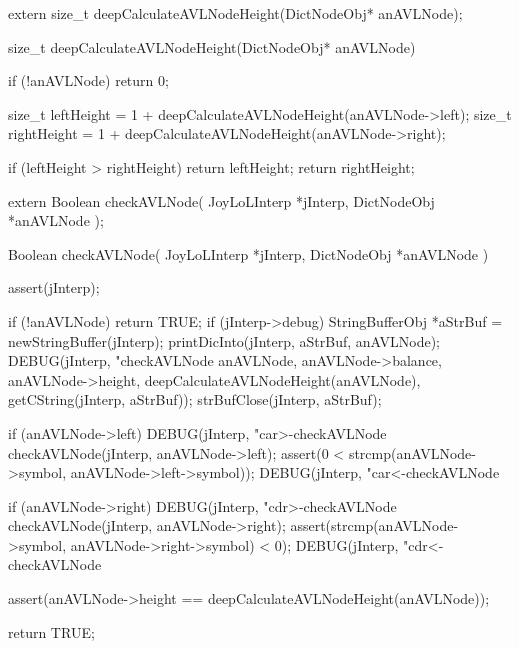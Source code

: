 \startCHeader
extern size_t deepCalculateAVLNodeHeight(DictNodeObj* anAVLNode);
\stopCHeader

\startCCode
size_t deepCalculateAVLNodeHeight(DictNodeObj* anAVLNode) {
  if (!anAVLNode) return 0;

  size_t leftHeight = 1 + deepCalculateAVLNodeHeight(anAVLNode->left);
  size_t rightHeight = 1 + deepCalculateAVLNodeHeight(anAVLNode->right);

  if (leftHeight > rightHeight) return leftHeight;
  return rightHeight;
}
\stopCCode

\startCHeader
extern Boolean checkAVLNode(
  JoyLoLInterp *jInterp,
  DictNodeObj  *anAVLNode
);
\stopCHeader

\startCCode
Boolean checkAVLNode(
  JoyLoLInterp *jInterp,
  DictNodeObj  *anAVLNode
) {
  assert(jInterp);
  
  if (!anAVLNode) return TRUE;
  if (jInterp->debug) {
    StringBufferObj *aStrBuf = 
      newStringBuffer(jInterp);
    printDicInto(jInterp, aStrBuf, anAVLNode);
    DEBUG(jInterp, "checkAVLNode %
          anAVLNode, anAVLNode->balance, anAVLNode->height,
          deepCalculateAVLNodeHeight(anAVLNode),
          getCString(jInterp, aStrBuf));
    strBufClose(jInterp, aStrBuf);
  }

  if (anAVLNode->left) {
      DEBUG(jInterp, "car>-checkAVLNode %
      checkAVLNode(jInterp, anAVLNode->left);
      assert(0 < strcmp(anAVLNode->symbol,
                      anAVLNode->left->symbol));
    DEBUG(jInterp, "car<-checkAVLNode %
  }

  if (anAVLNode->right) {
    DEBUG(jInterp, "cdr>-checkAVLNode %
    checkAVLNode(jInterp, anAVLNode->right);
    assert(strcmp(anAVLNode->symbol,
                  anAVLNode->right->symbol) < 0);
    DEBUG(jInterp, "cdr<-checkAVLNode %
  }

  assert(anAVLNode->height == deepCalculateAVLNodeHeight(anAVLNode));

  return TRUE;
}
\stopCCode

